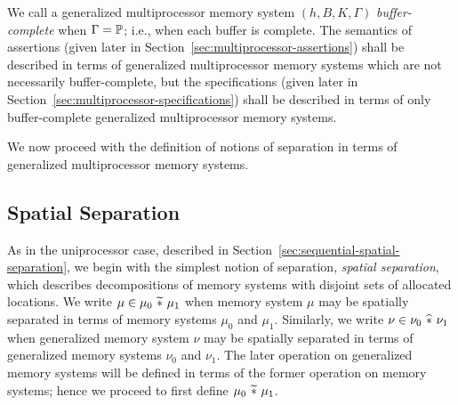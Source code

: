 \documentclass[11pt]{report}
\begin{document}
We call a generalized multiprocessor memory system $(h,B,K,\Gamma)$ \emph{buffer-complete} when $\Gamma = \mathbb{P}$; i.e., when each buffer is complete. The semantics of assertions (given later in Section~\ref{sec:multiprocessor-assertions}) shall be described in terms of generalized multiprocessor memory systems which are not necessarily buffer-complete, but the specifications (given later in Section~\ref{sec:multiprocessor-specifications}) shall be described in terms of only buffer-complete generalized multiprocessor memory systems.

We now proceed with the definition of notions of separation in terms of generalized multiprocessor memory systems. 

\subsection{Spatial Separation}
\label{sec:spatial-separation}

As in the uniprocessor case, described in Section~\ref{sec:sequential-spatial-separation}, we begin with the simplest notion of separation, \emph{spatial separation}, which describes decompositions of memory systems with disjoint sets of allocated locations. We write $\mu \in \mu_0 \operatorname{\,\widetilde{\ast}\,} \mu_1$ when memory system $\mu$ may be spatially separated in terms of memory systems $\mu_0$ and $\mu_1$. Similarly, we write $\nu \in \nu_0 \operatorname{\,\widehat{\ast}\,} \nu_1$ when generalized memory system $\nu$ may be spatially separated in terms of generalized memory systems $\nu_0$ and $\nu_1$. The later operation on generalized memory systems will be defined in terms of the former operation on memory systems; hence we proceed to first define $\mu_0 \operatorname{\,\widetilde{\ast}\,} \mu_1$. 
\end{document}
